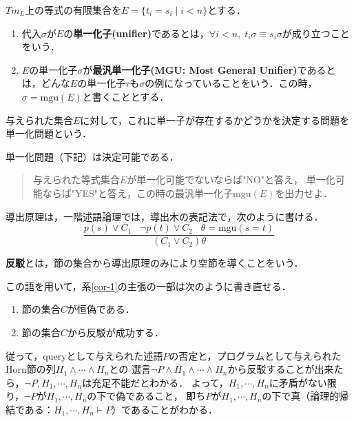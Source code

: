 \documentclass[uplatex,dvipdfmx]{jsarticle}
\begin{document}
\begin{definition}[unifier]
    $Tm_L$上の等式の有限集合を$E=\{t_i=s_i\mid i<n\}$とする．
    \begin{enumerate}
        \item 代入$\sigma$が$E$の\textbf{単一化子(unifier)}であるとは，$\forall i<n,\; t_i\sigma\equiv s_i\sigma$が成り立つことをいう．
        \item $E$の単一化子$\sigma$が\textbf{最汎単一化子(MGU: Most General Unifier)}であるとは，どんな$E$の単一化子$\tau$も$\sigma$の例になっていることをいう．この時，$\sigma=\mathrm{mgu}(E)$と書くこととする．
    \end{enumerate}
    与えられた集合$E$に対して，これに単一子が存在するかどうかを決定する問題を単一化問題という．
\end{definition}

\begin{theorem}
    単一化問題（下記）は決定可能である．
    \begin{quote}
        与えられた等式集合$E$が単一化可能でないならば"NO"と答え，
        単一化可能ならば"YES"と答え，この時の最汎単一化子$\mathrm{mgu}(E)$を出力せよ．
    \end{quote}
\end{theorem}

\begin{definition}[導出：一階述語論理]
    導出原理は，一階述語論理では，導出木の表記法で，次のように書ける．
    \[ \frac{p(s)\lor C_1\;\;\;\lnot p(t)\lor C_2\;\;\;\theta=\mathrm{mgu}(s=t)}{(C_1\lor C_2)\theta} \]
\end{definition}

\begin{definition}[refutation]
    \textbf{反駁}とは，節の集合から導出原理のみにより空節を導くことをいう．
\end{definition}
\begin{remark}
    この語を用いて，系\ref{cor-1}の主張の一部は次のように書き直せる．
    \begin{enumerate}
        \item 節の集合$C$が恒偽である．
        \item 節の集合$C$から反駁が成功する．
    \end{enumerate}
    従って，queryとして与えられた述語$P$の否定と，プログラムとして与えられたHorn節の列$H_1\land\cdots\land H_n$との
    選言$\lnot P\land H_1\land\cdots\land H_n$から反駁することが出来たら，$\lnot P,H_1,\cdots,H_n$は充足不能だとわかる．
    よって，$H_1,\cdots,H_n$に矛盾がない限り，$\lnot P$が$H_1,\cdots,H_n$の下で偽であること，
    即ち$P$が$H_1,\cdots,H_n$の下で真（論理的帰結である：$H_1,\cdots,H_n\vdash P$）であることがわかる．
\end{remark}
\end{document}
